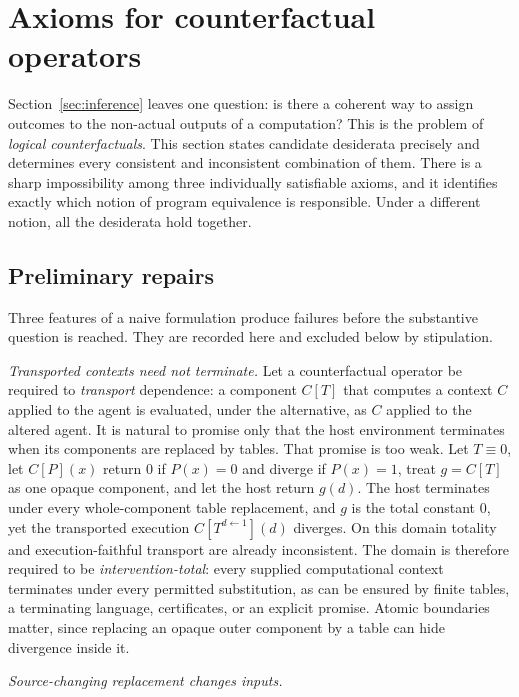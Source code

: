 \section{Axioms for counterfactual operators}\label{sec:operators}

Section~\ref{sec:inference} leaves one question: is there a coherent way to assign outcomes to the
non-actual outputs of a computation? This is the problem of \emph{logical counterfactuals}. This
section states candidate desiderata precisely and determines every consistent and inconsistent
combination of them. There is a sharp impossibility among three individually satisfiable axioms,
and it identifies exactly which notion of program equivalence is responsible. Under a different
notion, all the desiderata hold together.

\subsection{Preliminary repairs}

Three features of a naive formulation produce failures before the substantive question is reached.
They are recorded here and excluded below by stipulation.

\emph{Transported contexts need not terminate.} Let a counterfactual operator be required to
\emph{transport} dependence: a component $C[T]$ that computes a context $C$ applied to the agent is
evaluated, under the alternative, as $C$ applied to the altered agent. It is natural to promise only
that the host environment terminates when its components are replaced by tables. That promise is too
weak. Let $T\equiv0$, let $C[P](x)$ return $0$ if $P(x)=0$ and diverge if $P(x)=1$, treat $g=C[T]$ as one
opaque component, and let the host return $g(d)$. The host terminates under every whole-component table
replacement, and $g$ is the total constant $0$, yet the transported execution $C[T^{d\leftarrow1}](d)$
diverges. On this domain totality and execution-faithful transport are already inconsistent. The
domain is therefore required to be \emph{intervention-total}: every supplied computational context
terminates under every permitted substitution, as can be ensured by finite tables, a terminating
language, certificates, or an explicit promise. Atomic boundaries matter, since replacing an opaque
outer component by a table can hide divergence inside it.

\emph{Source-changing replacement changes inputs.}

